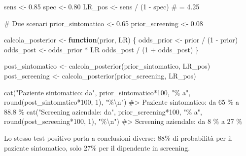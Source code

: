 \documentclass[
  italian,
  letterpaper,
  a4paper,
  11pt,
  open=any]{scrbook}
\newenvironment{Shaded}{\begin{snugshade}}{\end{snugshade}}
\newcommand{\CommentTok}[1]{\textcolor[rgb]{0.37,0.37,0.37}{#1}}
\newcommand{\ControlFlowTok}[1]{\textcolor[rgb]{0.00,0.23,0.31}{\textbf{#1}}}
\newcommand{\DecValTok}[1]{\textcolor[rgb]{0.68,0.00,0.00}{#1}}
\newcommand{\FloatTok}[1]{\textcolor[rgb]{0.68,0.00,0.00}{#1}}
\newcommand{\FunctionTok}[1]{\textcolor[rgb]{0.28,0.35,0.67}{#1}}
\newcommand{\NormalTok}[1]{\textcolor[rgb]{0.00,0.23,0.31}{#1}}
\newcommand{\OtherTok}[1]{\textcolor[rgb]{0.00,0.23,0.31}{#1}}
\newcommand{\SpecialCharTok}[1]{\textcolor[rgb]{0.37,0.37,0.37}{#1}}
\newcommand{\StringTok}[1]{\textcolor[rgb]{0.13,0.47,0.30}{#1}}
\theoremstyle{plain}
\theoremstyle{definition}
\theoremstyle{definition}
\theoremstyle{remark}
\begin{document}
\begin{Shaded}
\begin{Highlighting}[]
\NormalTok{sens }\OtherTok{\textless{}{-}} \FloatTok{0.85}
\NormalTok{spec }\OtherTok{\textless{}{-}} \FloatTok{0.80}
\NormalTok{LR\_pos }\OtherTok{\textless{}{-}}\NormalTok{ sens }\SpecialCharTok{/}\NormalTok{ (}\DecValTok{1} \SpecialCharTok{{-}}\NormalTok{ spec)  }\CommentTok{\# = 4.25}

\CommentTok{\# Due scenari}
\NormalTok{prior\_sintomatico }\OtherTok{\textless{}{-}} \FloatTok{0.65}
\NormalTok{prior\_screening }\OtherTok{\textless{}{-}} \FloatTok{0.08}

\NormalTok{calcola\_posterior }\OtherTok{\textless{}{-}} \ControlFlowTok{function}\NormalTok{(prior, LR) \{}
\NormalTok{  odds\_prior }\OtherTok{\textless{}{-}}\NormalTok{ prior }\SpecialCharTok{/}\NormalTok{ (}\DecValTok{1} \SpecialCharTok{{-}}\NormalTok{ prior)}
\NormalTok{  odds\_post }\OtherTok{\textless{}{-}}\NormalTok{ odds\_prior }\SpecialCharTok{*}\NormalTok{ LR}
\NormalTok{  odds\_post }\SpecialCharTok{/}\NormalTok{ (}\DecValTok{1} \SpecialCharTok{+}\NormalTok{ odds\_post)}
\NormalTok{\}}

\NormalTok{post\_sintomatico }\OtherTok{\textless{}{-}} \FunctionTok{calcola\_posterior}\NormalTok{(prior\_sintomatico, LR\_pos)}
\NormalTok{post\_screening }\OtherTok{\textless{}{-}} \FunctionTok{calcola\_posterior}\NormalTok{(prior\_screening, LR\_pos)}

\FunctionTok{cat}\NormalTok{(}\StringTok{"Paziente sintomatico: da"}\NormalTok{, prior\_sintomatico}\SpecialCharTok{*}\DecValTok{100}\NormalTok{, }\StringTok{"\% a"}\NormalTok{, }
    \FunctionTok{round}\NormalTok{(post\_sintomatico}\SpecialCharTok{*}\DecValTok{100}\NormalTok{, }\DecValTok{1}\NormalTok{), }\StringTok{"\%}\SpecialCharTok{\textbackslash{}n}\StringTok{"}\NormalTok{)}
\CommentTok{\#\textgreater{} Paziente sintomatico: da 65 \% a 88.8 \%}
\FunctionTok{cat}\NormalTok{(}\StringTok{"Screening aziendale: da"}\NormalTok{, prior\_screening}\SpecialCharTok{*}\DecValTok{100}\NormalTok{, }\StringTok{"\% a"}\NormalTok{, }
    \FunctionTok{round}\NormalTok{(post\_screening}\SpecialCharTok{*}\DecValTok{100}\NormalTok{, }\DecValTok{1}\NormalTok{), }\StringTok{"\%}\SpecialCharTok{\textbackslash{}n}\StringTok{"}\NormalTok{)}
\CommentTok{\#\textgreater{} Screening aziendale: da 8 \% a 27 \%}
\end{Highlighting}
\end{Shaded}

Lo stesso test positivo porta a conclusioni diverse: 88\% di probabilità
per il paziente sintomatico, solo 27\% per il dipendente in screening.
\end{document}
